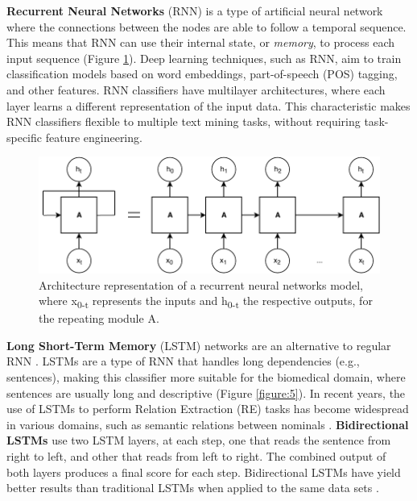 \textbf{Recurrent Neural Networks} (RNN) is a type of artificial neural network where the connections between the nodes are able to follow a temporal sequence. This means that RNN can use their internal state, or \textit{memory}, to process each input sequence (Figure \ref{figure:4}). Deep learning techniques, such as RNN, aim to train classification models based on word embeddings, part-of-speech (POS) tagging, and other features. RNN classifiers have multilayer architectures, where each layer learns a different representation of the input data. This characteristic makes RNN classifiers flexible to multiple text mining tasks, without requiring task-specific feature engineering.

\begin{figure}[hbt!]
\captionsetup{font=small}
\centering
\includegraphics[width=13cm]{images/figure_4.pdf}
\fontsize{9}{10.8}\caption[Recurrent Neural Networks Architecture]{Architecture representation of a recurrent neural networks model, where x\textsubscript{0-t} represents the inputs and h\textsubscript{0-t} the respective outputs, for the repeating module A.}
\label{figure:4}
\end{figure}

\textbf{Long Short-Term Memory} (LSTM) networks are an alternative to regular RNN \citep{Hochreiter:1997:LSM:1246443.1246450}.  LSTMs are a type of RNN that handles long dependencies (e.g., sentences), making this classifier more suitable for the biomedical domain, where sentences are usually long and descriptive (Figure \ref{figure:5}). In recent years, the use of LSTMs to perform Relation Extraction (RE) tasks has become widespread in various domains, such as semantic relations between nominals \citep{miwa-bansal-2016-end}. \textbf{Bidirectional LSTMs} use two LSTM layers, at each step, one that reads the sentence from right to left, and other that reads from left to right. The combined output of both layers produces a final score for each step. Bidirectional LSTMs have yield better results than traditional LSTMs when applied to the same data sets \citep{zhang-etal-2015-bidirectional}.

